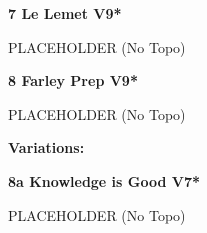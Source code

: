 \begin{multicols}{2}
\needspace{1.5cm}
\label{rt:Le Lemet}
\colorbox{Goldenrod!50}{
\parbox{0.95\linewidth}{
\textbf{
7 Le Lemet V9*  
}}}

\begin{adjustwidth}{0.5cm}{}			
PLACEHOLDER (No Topo)
\end{adjustwidth}



\needspace{1.5cm}
\label{rt:Farley Prep}
\colorbox{Goldenrod!50}{
\parbox{0.95\linewidth}{
\textbf{
8 Farley Prep V9*  
}}}

\begin{adjustwidth}{0.5cm}{}			
PLACEHOLDER (No Topo)
\end{adjustwidth}

\begin{adjustwidth}{0.5cm}{}				
\needspace{3cm}
\textbf{Variations:} \newline

\needspace{1.5cm}
\label{vr:Knowledge is Good}
\colorbox{Goldenrod!50}{
\parbox{0.95\linewidth}{
\textbf{
8a Knowledge is Good V7*  
}}}

\begin{adjustwidth}{0.5cm}{}			
PLACEHOLDER (No Topo)
\end{adjustwidth}


\end{adjustwidth}




\end{multicols}
\clearpage